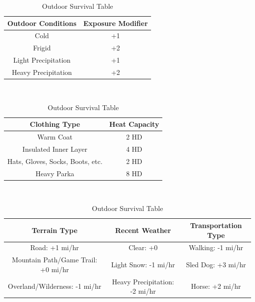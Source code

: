 \documentclass[notitlepage]{article}
\begin{document}
\begin{table}[h]
  \centering \large
  \begin{tabular}{|c||c|}
    \hline Outdoor Conditions & Exposure Modifier \\ \hline
    Cold & +1 \\
    Frigid & +2 \\
    Light Precipitation & +1 \\
    Heavy Precipitation & +2 \\ \hline
  \end{tabular} \\

  \begin{tabular}{|c||c|}
    \hline Clothing Type & Heat Capacity \\ \hline
    Warm Coat & 2 HD \\
    Insulated Inner Layer & 4 HD \\
    Hats, Gloves, Socks, Boots, etc. & 2 HD \\
    Heavy Parka & 8 HD \\ \hline
  \end{tabular} \\

  \begin{tabular}{|c||c||c|}
    \hline Terrain Type & Recent Weather & Transportation Type \\ \hline
    Road: +1 mi/hr & Clear: +0 & Walking: -1 mi/hr \\
    Mountain Path/Game Trail: +0 mi/hr & Light Snow: -1 mi/hr & Sled Dog: +3 mi/hr \\
    Overland/Wilderness: -1 mi/hr & Heavy Precipitation: -2 mi/hr & Horse: +2 mi/hr \\ \hline
  \end{tabular}
  \caption{Outdoor Survival Table}
  \label{tab:outdoor-survival}
\end{table}
\end{document}
